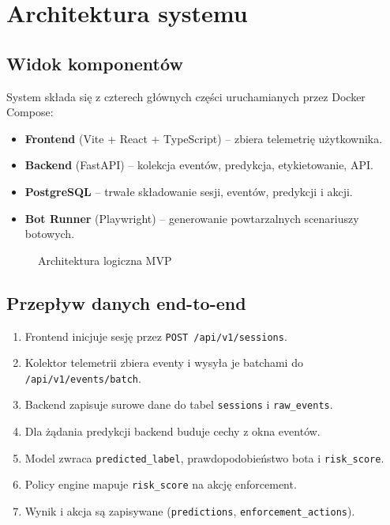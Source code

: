 \section{Architektura systemu}

\subsection{Widok komponentów}
System składa się z czterech głównych części uruchamianych przez Docker Compose:
\begin{itemize}
  \item \textbf{Frontend} (Vite + React + TypeScript) -- zbiera telemetrię użytkownika.
  \item \textbf{Backend} (FastAPI) -- kolekcja eventów, predykcja, etykietowanie, API.
  \item \textbf{PostgreSQL} -- trwałe składowanie sesji, eventów, predykcji i akcji.
  \item \textbf{Bot Runner} (Playwright) -- generowanie powtarzalnych scenariuszy botowych.
\end{itemize}

\begin{figure}[H]
  \centering
  \resizebox{0.98\textwidth}{!}{}
  \caption{Architektura logiczna MVP}
\end{figure}

\subsection{Przepływ danych end-to-end}
\begin{enumerate}
  \item Frontend inicjuje sesję przez \texttt{POST /api/v1/sessions}.
  \item Kolektor telemetrii zbiera eventy i wysyła je batchami do \texttt{/api/v1/events/batch}.
  \item Backend zapisuje surowe dane do tabel \texttt{sessions} i \texttt{raw\_events}.
  \item Dla żądania predykcji backend buduje cechy z okna eventów.
  \item Model zwraca \texttt{predicted\_label}, prawdopodobieństwo bota i \texttt{risk\_score}.
  \item Policy engine mapuje \texttt{risk\_score} na akcję enforcement.
  \item Wynik i akcja są zapisywane (\texttt{predictions}, \texttt{enforcement\_actions}).
\end{enumerate}

